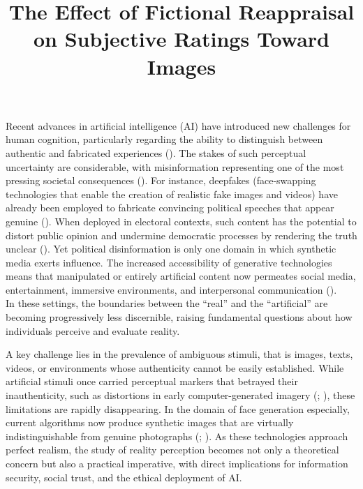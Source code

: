 \documentclass[
  jou,
  floatsintext,
  longtable,
  nolmodern,
  notxfonts,
  notimes,
  colorlinks=true,linkcolor=blue,citecolor=blue,urlcolor=blue]{apa7}
\title{The Effect of Fictional Reappraisal on Subjective Ratings Toward
Images}
\begin{document}
\maketitle


\setcounter{secnumdepth}{-\maxdimen} %

\setlength\LTleft{0pt}

\resetlinenumber[1]

Recent advances in artificial intelligence (AI) have introduced new
challenges for human cognition, particularly regarding the ability to
distinguish between authentic and fabricated experiences
(). The stakes of such
perceptual uncertainty are considerable, with misinformation
representing one of the most pressing societal consequences
(). For instance,
deepfakes (face-swapping technologies that enable the creation of
realistic fake images and videos) have already been employed to
fabricate convincing political speeches that appear genuine
(). When
deployed in electoral contexts, such content has the potential to
distort public opinion and undermine democratic processes by rendering
the truth unclear (). Yet political disinformation is only one domain in which
synthetic media exerts influence. The increased accessibility of
generative technologies means that manipulated or entirely artificial
content now permeates social media, entertainment, immersive
environments, and interpersonal communication
().\\
In these settings, the boundaries between the ``real'' and the
``artificial'' are becoming progressively less discernible, raising
fundamental questions about how individuals perceive and evaluate
reality.

A key challenge lies in the prevalence of ambiguous stimuli, that is
images, texts, videos, or environments whose authenticity cannot be
easily established. While artificial stimuli once carried perceptual
markers that betrayed their inauthenticity, such as distortions in early
computer-generated imagery (; ), these limitations are rapidly disappearing. In the domain of
face generation especially, current algorithms now produce synthetic
images that are virtually indistinguishable from genuine photographs
(;
). As these
technologies approach perfect realism, the study of reality perception
becomes not only a theoretical concern but also a practical imperative,
with direct implications for information security, social trust, and the
ethical deployment of AI.
\end{document}
